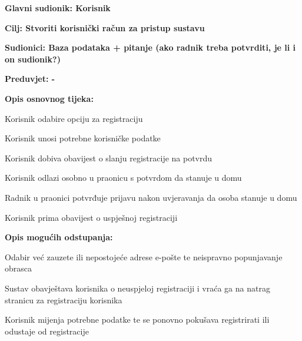 				\noindent {}
				\begin{packed_item}
					
					\item \textbf{Glavni sudionik: Korisnik}
					\item  \textbf{Cilj: Stvoriti korisnički račun za pristup sustavu}
					\item  \textbf{Sudionici: Baza podataka + pitanje (ako radnik treba potvrditi, je li i on sudionik?)}
					\item  \textbf{Preduvjet: -}
					\item  \textbf{Opis osnovnog tijeka:}
					
					\item[] \begin{packed_enum}
						
						\item Korisnik odabire opciju za registraciju
						\item Korisnik unosi potrebne korisničke podatke
						\item Korisnik dobiva obavijest o slanju registracije na potvrdu
						\item Korisnik odlazi osobno u praonicu s potvrdom da stanuje u domu 
						\item Radnik u praonici potvrđuje prijavu nakon uvjeravanja da osoba stanuje u domu
						\item Korisnik prima obavijest o uspješnoj registraciji
					\end{packed_enum}
					
					\item  \textbf{Opis mogućih odstupanja:}
					
					\item[] \begin{packed_item}
						
						\item[2.a] Odabir već zauzete ili nepostojeće adrese e-pošte te neispravno popunjavanje obrasca
						\item[] \begin{packed_enum}
							
							\item Sustav obavještava korisnika o neuspjeloj registraciji i vraća ga na natrag stranicu za registraciju
korisnika
							\item Korisnik mijenja potrebne podatke te se ponovno pokušava registrirati ili odustaje od registracije
							
						\end{packed_enum}
					

\end{packed_item}
\end{packed_item}
